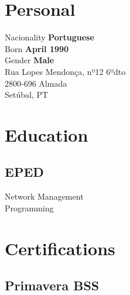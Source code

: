 \documentclass[letterpaper]{deedy-resume} %
\begin{document}

\lastupdated %



\begin{minipage}[t]{0.33\textwidth}

\section{Personal} 

Nacionality \textbf{Portuguese}\\
Born \textbf{April 1990}\\
Gender \textbf{Male}\\

Rua Lopes Mendonça, nº12 6ºdto\\
2800-696 Almada\\
Setúbal, PT\\

\sectionspace

\section{Education}
\subsection{EPED}
Network Management\\
Programming

\sectionspace

\section{Certifications}
\subsection{Primavera BSS}

\end{minipage}
\end{document}
